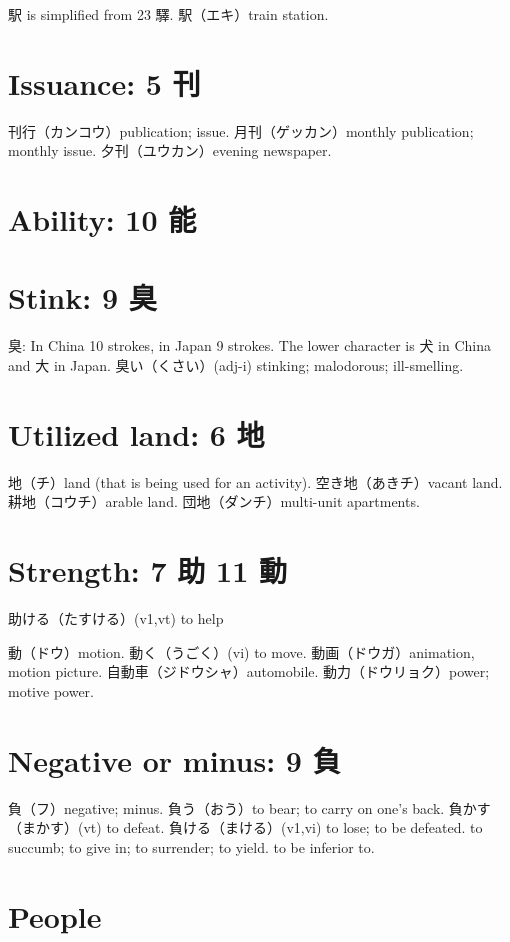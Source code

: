 駅 is simplified from 23 驛.
駅（エキ）train station.

\section{Issuance: 5 刊}

刊行（カンコウ）publication; issue.
月刊（ゲッカン）monthly publication; monthly issue.
夕刊（ユウカン）evening newspaper.

\section{Ability: 10 能}

\section{Stink: 9 臭}

臭: In China 10 strokes, in Japan 9 strokes.
The lower character is 犬 in China and 大 in Japan.
臭い（くさい）(adj-i) stinking; malodorous; ill-smelling.

\section{Utilized land: 6 地}

地（チ）land (that is being used for an activity).
空き地（あきチ）vacant land.
耕地（コウチ）arable land.
団地（ダンチ）multi-unit apartments.

\section{Strength: 7 助 11 動}

助ける（たすける）(v1,vt) to help

動（ドウ）motion.
動く（うごく）(vi) to move.
動画（ドウガ）animation, motion picture.
自動車（ジドウシャ）automobile.
動力（ドウリョク）power; motive power.

\section{Negative or minus: 9 負}

負（フ）negative; minus.
負う（おう）to bear; to carry on one's back.
負かす（まかす）(vt) to defeat.
負ける（まける）(v1,vi)
to lose; to be defeated.
to succumb; to give in; to surrender; to yield.
to be inferior to.

\section{People}

